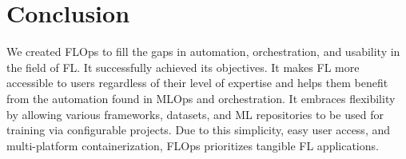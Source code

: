 \chapter{Conclusion}\label{chapter:conclusion}

We created FLOps to fill the gaps in automation, orchestration, and usability in the field of FL.
It successfully achieved its objectives.
It makes FL more accessible to users regardless of their level of expertise and helps them benefit from the automation found in MLOps and orchestration.
It embraces flexibility by allowing various frameworks, datasets, and ML repositories to be used for training via configurable projects.
Due to this simplicity, easy user access, and multi-platform containerization, FLOps prioritizes tangible FL applications.

